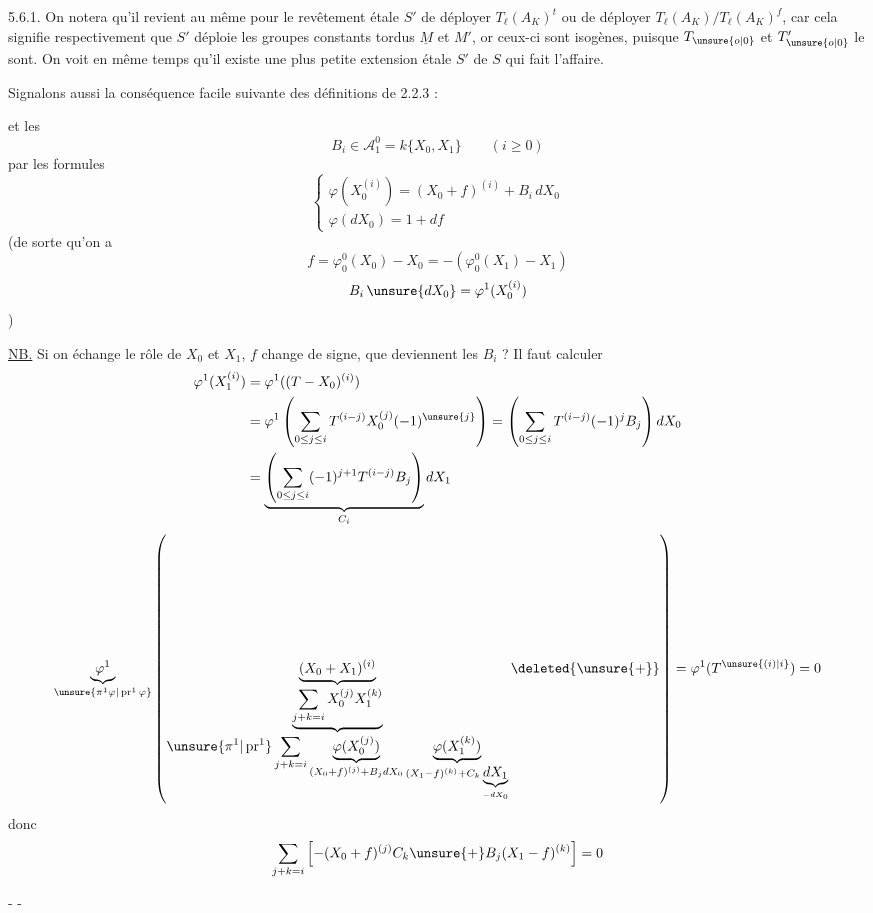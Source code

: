5.6.1. On notera qu'il revient au même pour le revêtement étale $S'$ de déployer $T_\ell(A_K)^t$ ou de déployer $T_\ell(A_K)/T_\ell(A_K)^f$, car cela signifie respectivement que $S'$ déploie les groupes constants tordus $\underline M$ et \uline{$M'$}, or ceux-ci sont isogènes, puisque $T_{\unsure{o|0}}$ et $T'_{\unsure{o|0}}$ le sont. On voit en même temps qu'il existe une plus petite extension étale $S'$ de $S$ qui fait l'affaire.

Signalons aussi la conséquence facile suivante des définitions de 2.2.3 :

\margin{-}

et les
\[
\boxed{B_i\in\mathcal A_1^0=k\{X_0,X_1\}\qquad(i\ge0)}
\]
par les formules
\[
\begin{cases}
\varphi(X_0^{(i)})=(X_0+f)^{(i)}+B_i\,dX_0\\
\varphi(dX_0)=1+df
\end{cases}
\]
(de sorte qu'on a
\[
f=\varphi_0^0(X_0)-X_0=-(\varphi_0^0(X_1)-X_1)
\]
\[
B_i\,\unsure{dX_0}=\varphi^1(X_0^{(i)})
\]
)

\uline{NB.} Si on échange le rôle de $X_0$ et $X_1$, $f$ change de signe, que deviennent les $B_i$ ? Il faut calculer
\[
\begin{aligned}
\varphi^1(X_1^{(i)})&=\varphi^1((T-X_0)^{(i)})\\
&=\varphi^1\left(\sum_{0\le j\le i}T^{(i-j)}X_0^{(j)}(-1)^{\unsure{j}}\right)
=\left(\sum_{0\le j\le i}T^{(i-j)}(-1)^jB_j\right)dX_0\\
&=\underbrace{\left(\sum_{0\le j\le i}(-1)^{j+1}T^{(i-j)}B_j\right)}_{C_i}dX_1
\end{aligned}
\]
\[
\underbrace{\varphi^1}_{\unsure{\pi^1\varphi|\operatorname{pr}^1\varphi}}
\left(
\underbrace{(X_0+X_1)^{(i)}}_{
\underbrace{\displaystyle\sum_{j+k=i}X_0^{(j)}X_1^{(k)}}_{
\displaystyle\unsure{\pi^1|\operatorname{pr}^1}\sum_{j+k=i}
\underbrace{\varphi(X_0^{(j)})}_{(X_0+f)^{(j)}+B_jdX_0}
\underbrace{\varphi(X_1^{(k)})}_{(X_1-f)^{(k)}+C_k\underbrace{dX_1}_{-dX_0}}
}}
\deleted{\unsure{+}}
\right)=\varphi^1(T^{\unsure{(i)|i}})=0
\]
donc
\[
\sum_{j+k=i}\left[-(X_0+f)^{(j)}C_k\unsure{+}B_j(X_1-f)^{(k)}\right]=0
\]

\begin{center}-  -\end{center}

